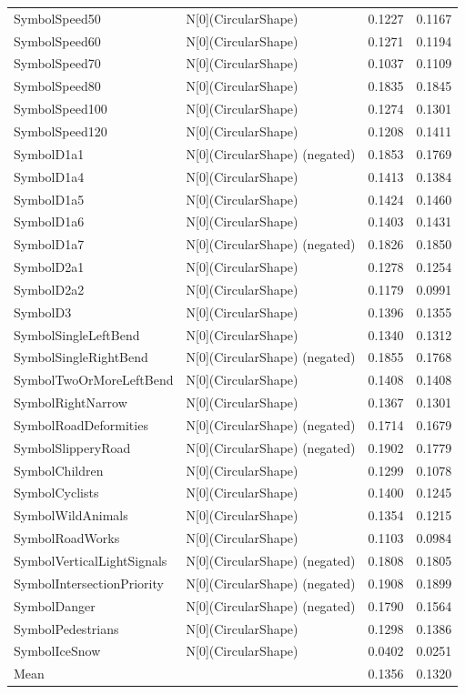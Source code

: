 \begin{tabular}{llll}
SymbolSpeed50 & N[0](CircularShape) & 0.1227 & 0.1167 \\
SymbolSpeed60 & N[0](CircularShape) & 0.1271 & 0.1194 \\
SymbolSpeed70 & N[0](CircularShape) & 0.1037 & 0.1109 \\
SymbolSpeed80 & N[0](CircularShape) & 0.1835 & 0.1845 \\
SymbolSpeed100 & N[0](CircularShape) & 0.1274 & 0.1301 \\
SymbolSpeed120 & N[0](CircularShape) & 0.1208 & 0.1411 \\
SymbolD1a1 & N[0](CircularShape) (negated) & 0.1853 & 0.1769 \\
SymbolD1a4 & N[0](CircularShape) & 0.1413 & 0.1384 \\
SymbolD1a5 & N[0](CircularShape) & 0.1424 & 0.1460 \\
SymbolD1a6 & N[0](CircularShape) & 0.1403 & 0.1431 \\
SymbolD1a7 & N[0](CircularShape) (negated) & 0.1826 & 0.1850 \\
SymbolD2a1 & N[0](CircularShape) & 0.1278 & 0.1254 \\
SymbolD2a2 & N[0](CircularShape) & 0.1179 & 0.0991 \\
SymbolD3 & N[0](CircularShape) & 0.1396 & 0.1355 \\
SymbolSingleLeftBend & N[0](CircularShape) & 0.1340 & 0.1312 \\
SymbolSingleRightBend & N[0](CircularShape) (negated) & 0.1855 & 0.1768 \\
SymbolTwoOrMoreLeftBend & N[0](CircularShape) & 0.1408 & 0.1408 \\
SymbolRightNarrow & N[0](CircularShape) & 0.1367 & 0.1301 \\
SymbolRoadDeformities & N[0](CircularShape) (negated) & 0.1714 & 0.1679 \\
SymbolSlipperyRoad & N[0](CircularShape) (negated) & 0.1902 & 0.1779 \\
SymbolChildren & N[0](CircularShape) & 0.1299 & 0.1078 \\
SymbolCyclists & N[0](CircularShape) & 0.1400 & 0.1245 \\
SymbolWildAnimals & N[0](CircularShape) & 0.1354 & 0.1215 \\
SymbolRoadWorks & N[0](CircularShape) & 0.1103 & 0.0984 \\
SymbolVerticalLightSignals & N[0](CircularShape) (negated) & 0.1808 & 0.1805 \\
SymbolIntersectionPriority & N[0](CircularShape) (negated) & 0.1908 & 0.1899 \\
SymbolDanger & N[0](CircularShape) (negated) & 0.1790 & 0.1564 \\
SymbolPedestrians & N[0](CircularShape) & 0.1298 & 0.1386 \\
SymbolIceSnow & N[0](CircularShape) & 0.0402 & 0.0251 \\
Mean &  & 0.1356 & 0.1320 \\
\bottomrule
\end{tabular}
